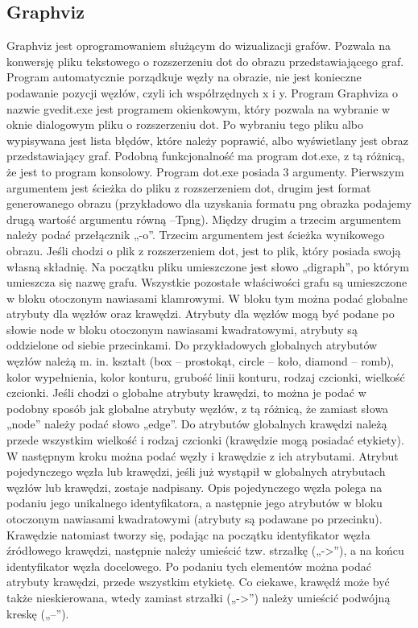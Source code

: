 \documentclass[oneside,a4paper]{book}
\begin{document}
\begin{spacing}{1.5}
\section{Graphviz}

Graphviz\cite{Graphviz} jest oprogramowaniem służącym do wizualizacji grafów. Pozwala na konwersję pliku tekstowego o rozszerzeniu dot do obrazu przedstawiającego graf. Program automatycznie porządkuje węzły na obrazie, nie jest konieczne podawanie pozycji węzłów, czyli ich współrzędnych x i y. Program Graphviza o nazwie gvedit.exe jest programem okienkowym, który pozwala na wybranie w oknie dialogowym pliku o rozszerzeniu dot. Po wybraniu tego pliku albo wypisywana jest lista błędów, które należy poprawić, albo wyświetlany jest obraz przedstawiający graf. Podobną funkcjonalność ma program dot.exe, z tą różnicą, że jest to program konsolowy. Program dot.exe posiada 3 argumenty. Pierwszym argumentem jest ścieżka do pliku z rozszerzeniem dot, drugim jest format generowanego obrazu (przykładowo dla uzyskania formatu png obrazka podajemy drugą wartość argumentu równą –Tpng). Między drugim a trzecim argumentem należy podać przełącznik „-o”. Trzecim argumentem jest ścieżka wynikowego obrazu. Jeśli chodzi o plik z rozszerzeniem dot, jest to plik, który posiada swoją własną składnię. Na początku pliku umieszczone jest słowo „digraph”, po którym umieszcza się nazwę grafu. Wszystkie pozostałe właściwości grafu są umieszczone w bloku otoczonym nawiasami klamrowymi. W bloku tym można podać globalne atrybuty dla węzłów oraz krawędzi. Atrybuty dla węzłów mogą być podane po słowie node w bloku otoczonym nawiasami kwadratowymi, atrybuty są oddzielone od siebie przecinkami. Do przykładowych globalnych atrybutów węzłów należą m. in. kształt (box – prostokąt, circle – koło, diamond – romb), kolor wypełnienia, kolor konturu, grubość linii konturu, rodzaj czcionki, wielkość czcionki. Jeśli chodzi o globalne atrybuty krawędzi, to można je podać w podobny sposób jak globalne atrybuty węzłów, z tą różnicą, że zamiast słowa „node” należy podać słowo „edge”. Do atrybutów globalnych krawędzi należą przede wszystkim wielkość i rodzaj czcionki (krawędzie mogą posiadać etykiety). W następnym kroku można podać węzły i krawędzie z ich atrybutami. Atrybut pojedynczego węzła lub krawędzi, jeśli już wystąpił w globalnych atrybutach węzłów lub krawędzi, zostaje nadpisany. Opis pojedynczego węzła polega na podaniu jego unikalnego identyfikatora, a następnie jego atrybutów w bloku otoczonym nawiasami kwadratowymi (atrybuty są podawane po przecinku).  Krawędzie natomiast tworzy się, podając na początku identyfikator węzła źródłowego krawędzi, następnie należy umieścić tzw. strzałkę („->”), a na końcu identyfikator węzła docelowego. Po podaniu tych elementów można podać atrybuty krawędzi, przede wszystkim etykietę. Co ciekawe, krawędź może być także nieskierowana, wtedy zamiast strzałki („->”) należy umieścić podwójną kreskę („--”). 

\end{spacing}
\end{document}
